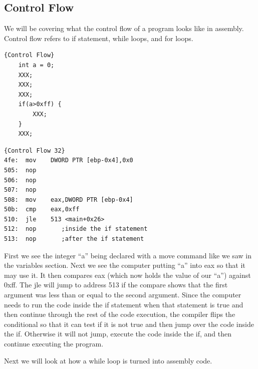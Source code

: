 \documentclass{report}
\begin{document}
\subsection{Control Flow}
We will be covering what the control flow of a program looks like in assembly.  Control flow refers to if statement, while loops, and for loops.
\newline
\begin{minipage}{.45\textwidth}
\begin{lstlisting}[caption=Control Flow if statements,frame=tlrb]{Control Flow}
    int a = 0;
    XXX;
    XXX;
    XXX;
    if(a>0xff) {
        XXX;
    }
    XXX;

\end{lstlisting}
\end{minipage}\hfill
\begin{minipage}{.45\textwidth}
\begin{lstlisting}[caption=assembly 32bit,frame=tlrb]{Control Flow 32}
4fe:  mov    DWORD PTR [ebp-0x4],0x0
505:  nop
506:  nop
507:  nop
508:  mov    eax,DWORD PTR [ebp-0x4]
50b:  cmp    eax,0xff
510:  jle    513 <main+0x26>
512:  nop 		;inside the if statement
513:  nop	    ;after the if statement
\end{lstlisting}
\end{minipage}
\newline
First we see the integer ``a'' being declared with a move command like we saw in the variables section.  Next we see the computer putting ``a'' into eax so that it may use it.  It then compares eax (which now holds the value of our ``a'') against 0xff.  The jle will jump to address 513 if the compare shows that the first argument was less than or equal to the second argument.  Since the computer needs to run the code inside the if statement when that statement is true and then continue through the rest of the code execution, the compiler flips the conditional so that it can test if it is not true and then jump over the code inside the if.  Otherwise it will not jump, execute the code inside the if, and then continue executing the program.\newline


Next we will look at how a while loop is turned into assembly code.
\end{document}
